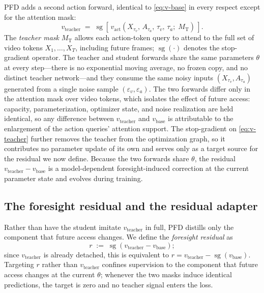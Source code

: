\documentclass{article}
\begin{document}
PFD adds a second action forward, identical to \eqref{eq:v-base} in every respect except for the attention mask:
\begin{equation}
v_\mathrm{teacher} \;=\; \operatorname{sg}\!\left[\, v_\mathrm{act}\!\left(X_{\tau_v},\, A_{\tau_a},\, \tau_v,\, \tau_a;\; M_\mathrm{T}\right) \,\right].
\label{eq:v-teacher}
\end{equation}
The \emph{teacher mask} $M_\mathrm{T}$ allows each action-token query to attend to the full set of video tokens $X_1, \ldots, X_T$, including future frames; $\operatorname{sg}(\cdot)$ denotes the stop-gradient operator. The teacher and student forwards share the same parameters $\theta$ at every step---there is no exponential moving average, no frozen copy, and no distinct teacher network---and they consume the same noisy inputs $(X_{\tau_v}, A_{\tau_a})$ generated from a single noise sample $(\varepsilon_v, \varepsilon_a)$. The two forwards differ only in the attention mask over video tokens, which isolates the effect of future access: capacity, parameterization, optimizer state, and noise realization are held identical, so any difference between $v_\mathrm{teacher}$ and $v_\mathrm{base}$ is attributable to the enlargement of the action queries' attention support. The stop-gradient on \eqref{eq:v-teacher} further removes the teacher from the optimization graph, so it contributes no parameter update of its own and serves only as a target source for the residual we now define. Because the two forwards share $\theta$, the residual $v_\mathrm{teacher} - v_\mathrm{base}$ is a model-dependent foresight-induced correction at the current parameter state and evolves during training.

\subsection{The foresight residual and the residual adapter}
\label{sec:method:residual}

Rather than have the student imitate $v_\mathrm{teacher}$ in full, PFD distills only the component that future access changes. We define the \emph{foresight residual} as
\begin{equation}
r \;:=\; \operatorname{sg}\!\left(v_\mathrm{teacher} - v_\mathrm{base}\right);
\label{eq:residual}
\end{equation}
since $v_\mathrm{teacher}$ is already detached, this is equivalent to $r = v_\mathrm{teacher} - \operatorname{sg}(v_\mathrm{base})$. Targeting $r$ rather than $v_\mathrm{teacher}$ confines supervision to the component that future access changes at the current $\theta$; whenever the two masks induce identical predictions, the target is zero and no teacher signal enters the loss.
\end{document}
